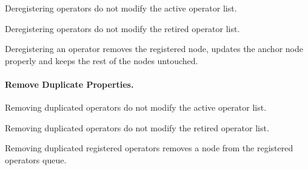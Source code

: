 \begin{theorem}
  \leanok
  \label{thm:OperatorDirectory.Properties.Actions.deregister_same_active}
  Deregistering operators do not modify the active operator list.
  \end{theorem}
\begin{theorem}
  \leanok
  \label{thm:OperatorDirectory.Properties.Actions.deregister_same_retired}
  Deregistering operators do not modify the retired operator list.
  \end{theorem}

\begin{theorem}
  \leanok
  \label{thm:deregister_register}
  Deregistering an operator removes the registered node, updates the anchor node
properly and keeps the rest of the nodes untouched.
  \end{theorem}


\paragraph*{Remove Duplicate Properties.}

\begin{theorem}
  \leanok
  \label{thm:OperatorDirectory.Properties.Actions.removeduplicatereg_same_active}
  Removing duplicated operators do not modify the active operator list.
  \end{theorem}
\begin{theorem}
  \leanok
  \label{thm:OperatorDirectory.Properties.Actions.removeduplicatereg_retired}
  Removing duplicated operators do not modify the retired operator list.
  \end{theorem}

\begin{theorem}
  \leanok
  \label{thm:OperatorDirectory.Properties.Actions.removeduplicatereg_removes_dup_registered}

  Removing duplicated registered operators removes a node from the registered
operators queue.

  \end{theorem}

